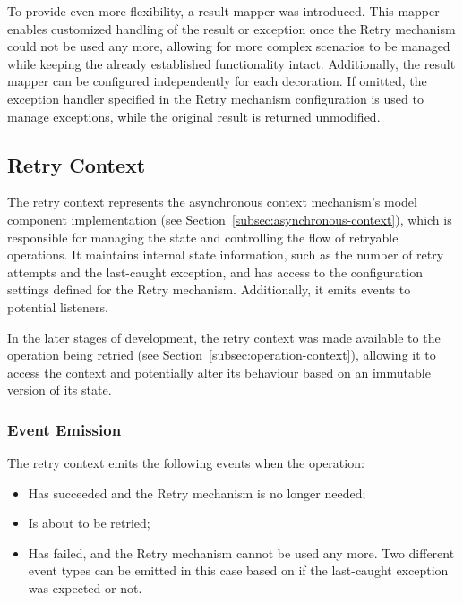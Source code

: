 To provide even more flexibility, a result mapper was introduced.
This mapper enables customized handling of the result or exception once the Retry mechanism could not be used any more,
allowing for more complex scenarios to be managed while keeping the already established functionality intact.
Additionally, the result mapper can be configured independently for each decoration.
If omitted, the exception handler specified in the Retry mechanism configuration is used to manage exceptions,
while the original result is returned unmodified.

\subsection{Retry Context}\label{subsec:retry-context}

The retry context represents the asynchronous context mechanism's model component implementation
(see Section~\ref{subsec:asynchronous-context}),
which is responsible for managing the state and controlling the flow of retryable operations.
It maintains internal state information, such as the number of retry attempts and the last-caught exception,
and has access to the configuration settings defined for the Retry mechanism.
Additionally, it emits events to potential listeners.

In the later stages of development,
the retry context was made available to the operation being retried (see Section~\ref{subsec:operation-context}),
allowing it to access the context and potentially alter its behaviour based on an immutable version of its state.

\subsubsection{Event Emission}\label{subsubsec:retry-context-event-emission}

The retry context emits the following events when the operation:

\begin{itemize}
    \item Has succeeded and the Retry mechanism is no longer needed;
    \item Is about to be retried;
    \item Has failed, and the Retry mechanism cannot be used any more.
    Two different event types can be emitted in this case based on if the last-caught exception was expected or not.
\end{itemize}

